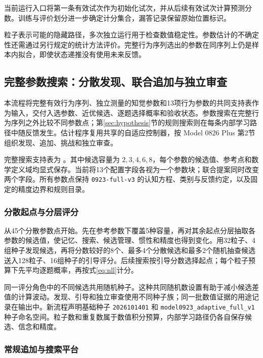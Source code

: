 \documentclass[12pt]{article}
\begin{document}
当前运行入口将第一条有效试次作为初始化试次，并从后续有效试次计算预测分数。训练与评价划分进一步确定计分集合，漏答记录保留原始位置标识。

粒子表示可能的隐藏路径，多次独立运行用于检查数值稳定性。参数估计的不确定性还需通过另行规定的统计方法评价。完整行为序列选出的参数在同序列上仍是样本内拟合，即使状态递推没有使用未来反馈。

\subsection{完整参数搜索：分散发现、联合追加与独立审查}
\label{sec:adaptive-fit}

本流程将完整有效行为序列、独立测量的知觉参数和13项行为参数的共同支持表作为输入，交付入选参数、近优候选、逐题选择概率和验收状态。参数搜索在完整行为序列之外比较不同参数点；第\ref{sec:hypothesis}节的规则搜索则在每条内部学习路径中随反馈发生。估计程序复用共享的自适应控制器，按 Model 0826 Plus 第2节组织发现、追加、挑战和独立审查。

完整搜索支持表为 。其中候选容量为 $2,3,4,6,8$，每个参数的候选值、参考点和数学定义域均显式保存。当前将13个配置字段各视为一个参数块；联合提案同时改变两个字段。所有参数点保持 \texttt{0923-full-v3} 的认知方程、类别与反馈约定，以及固定的精度边界和规则目录。

\subsubsection{分散起点与分层评分}

从45个分散参数点开始。先在参考参数下覆盖5种容量，再对其余起点分层抽取各参数的候选值，使记忆、搜索、候选管理、惯性和精度也得到变化。用32粒子、4组种子发现候选，再将分数较好的8个、最多4个分散候选和最多2个随机抽查候选送入128粒子、16组种子的引导评分。后续搜索按引导分数选择起点；每个粒子预算下先平均逐题概率，再按式\eqref{eq:nll}计分。

同一评分角色中的不同候选共用随机种子。这种共同随机数设置有助于减小候选差值的计算波动。发现、引导和独立审查使用不同种子族；同一批数值证据的用途记录在输出中。新流程声明基础种子 \texttt{2026101401} 和 \texttt{model0923\_adaptive\_full\_v1} 种子命名空间。粒子数和重复数属于数值积分预算，内部学习路径仍各自保存候选、信念和精度。

\subsubsection{常规追加与搜索平台}
\end{document}
